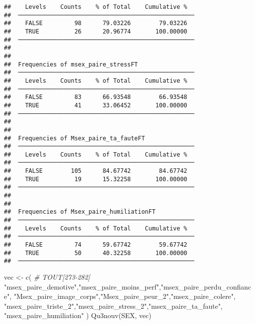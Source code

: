 \documentclass[
]{article}
\newenvironment{Shaded}{\begin{snugshade}}{\end{snugshade}}
\newcommand{\CommentTok}[1]{\textcolor[rgb]{0.56,0.35,0.01}{\textit{#1}}}
\newcommand{\FunctionTok}[1]{\textcolor[rgb]{0.00,0.00,0.00}{#1}}
\newcommand{\NormalTok}[1]{#1}
\newcommand{\OtherTok}[1]{\textcolor[rgb]{0.56,0.35,0.01}{#1}}
\newcommand{\StringTok}[1]{\textcolor[rgb]{0.31,0.60,0.02}{#1}}
\begin{document}
\begin{verbatim}
##    Levels    Counts    % of Total    Cumulative %   
##  ────────────────────────────────────────────────── 
##    FALSE         98      79.03226        79.03226   
##    TRUE          26      20.96774       100.00000   
##  ────────────────────────────────────────────────── 
## 
## 
##  Frequencies of msex_paire_stressFT                 
##  ────────────────────────────────────────────────── 
##    Levels    Counts    % of Total    Cumulative %   
##  ────────────────────────────────────────────────── 
##    FALSE         83      66.93548        66.93548   
##    TRUE          41      33.06452       100.00000   
##  ────────────────────────────────────────────────── 
## 
## 
##  Frequencies of Msex_paire_ta_fauteFT               
##  ────────────────────────────────────────────────── 
##    Levels    Counts    % of Total    Cumulative %   
##  ────────────────────────────────────────────────── 
##    FALSE        105      84.67742        84.67742   
##    TRUE          19      15.32258       100.00000   
##  ────────────────────────────────────────────────── 
## 
## 
##  Frequencies of Msex_paire_humiliationFT            
##  ────────────────────────────────────────────────── 
##    Levels    Counts    % of Total    Cumulative %   
##  ────────────────────────────────────────────────── 
##    FALSE         74      59.67742        59.67742   
##    TRUE          50      40.32258       100.00000   
##  ──────────────────────────────────────────────────
\end{verbatim}

\begin{Shaded}
\begin{Highlighting}[]
\NormalTok{vec }\OtherTok{\textless{}{-}} \FunctionTok{c}\NormalTok{(   }\CommentTok{\# TOUT[273{-}282]}
  \StringTok{"msex\_paire\_demotive"}\NormalTok{,}\StringTok{"msex\_paire\_moins\_perf"}\NormalTok{,}\StringTok{"msex\_paire\_perdu\_confiance"}\NormalTok{,}
  \StringTok{"Msex\_paire\_image\_corps"}\NormalTok{,}\StringTok{"Msex\_paire\_peur\_2"}\NormalTok{,}\StringTok{"msex\_paire\_colere"}\NormalTok{,}
  \StringTok{"msex\_paire\_triste\_2"}\NormalTok{,}\StringTok{"msex\_paire\_stress\_2"}\NormalTok{,}\StringTok{"msex\_paire\_ta\_faute"}\NormalTok{,}
  \StringTok{"msex\_paire\_humiliation"}
\NormalTok{  )}
\FunctionTok{Qu3nouv}\NormalTok{(SEX, vec)}
\end{Highlighting}
\end{Shaded}
\end{document}
